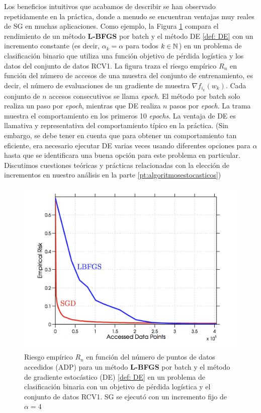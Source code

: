 	 Los beneficios intuitivos que acabamos de describir se han observado repetidamente en la práctica, donde a menudo se encuentran ventajas muy reales de SG en muchas aplicaciones. Como ejemplo, la Figura \ref{gfx: de} compara el rendimiento de un método \textbf{L-BFGS} por batch \cite{liu:1989} \cite{nocedal:1980} y el método DE \ref{def: DE} con un incremento constante (es decir, $\alpha_k = \alpha$ para todos $k \in {\mathbb{N}}$) en un problema de clasificación binario que utiliza una función objetivo de pérdida logística y los datos del conjunto de datos RCV1. La figura traza el riesgo empírico $R_n$ en función del número de accesos de una muestra del conjunto de entrenamiento, es decir, el número de evaluaciones de un gradiente de muestra $\nabla f_{i_k}(w_k)$. Cada conjunto de $n$ accesos consecutivos se llama \textit{epoch}. El método por batch solo realiza un paso por \textit{epoch}, mientras que DE realiza $n$ pasos por \textit{epoch}. La trama muestra el comportamiento en los primeros 10 \textit{epochs}. La ventaja de DE es llamativa y representativa del comportamiento típico en la práctica. (Sin embargo, se debe tener en cuenta que para obtener un comportamiento tan eficiente, era necesario ejecutar DE varias veces usando diferentes opciones para $\alpha$ hasta que se identificara una buena opción para este problema en particular. Discutimos cuestiones teóricas y prácticas relacionadas con la elección de incrementos en nuestro análisis en la parte \ref{pt:algoritmosestocasticos})


\begin{figure}[h]
	\label{gfx: de}
	\centering
	\includegraphics[scale=.3]{gfx/de.png}
	\caption{Riesgo empírico $R_n$ en función del número de puntos de datos accedidos (ADP) para un método \textbf{L-BFGS} por batch y el método de gradiente estocástico (DE) \ref{def: DE} en un problema de clasificación binaria con un objetivo de pérdida logística y el conjunto de datos RCV1. SG se ejecutó con un incremento fijo de $\alpha  = 4$}
\end{figure}

